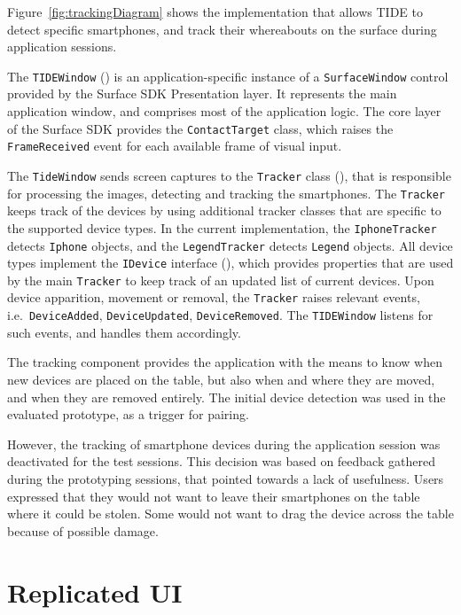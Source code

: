 Figure~\ref{fig:trackingDiagram} shows the implementation that allows TIDE to detect specific smartphones, and track their whereabouts on the surface during application sessions.

The \texttt{TIDEWindow} () is an application-specific instance of a \texttt{SurfaceWindow} control provided by the Surface SDK Presentation layer. 
It represents the main application window, and comprises most of the application logic.
The core layer of the Surface SDK provides the \texttt{ContactTarget} class, which raises the \texttt{FrameReceived} event for each available frame of visual input.

The \texttt{TideWindow} sends screen captures to the \texttt{Tracker} class (), that is responsible for processing the images, detecting and tracking the smartphones.
The \texttt{Tracker} keeps track of the devices by using additional tracker classes that are specific to the supported device types.
In the current implementation, the \texttt{IphoneTracker} detects \texttt{Iphone} objects, and the \texttt{LegendTracker} detects \texttt{Legend} objects.
All device types implement the \texttt{IDevice} interface (), which provides properties that are used by the main \texttt{Tracker} to keep track of an updated list of current devices.
Upon device apparition, movement or removal, the \texttt{Tracker} raises relevant events, i.e.\ \texttt{DeviceAdded}, \texttt{DeviceUpdated}, \texttt{DeviceRemoved}.
The \texttt{TIDEWindow} listens for such events, and handles them accordingly.

The tracking component provides the application with the means to know when new devices are placed on the table, but also when and where they are moved, and when they are removed entirely.
The initial device detection was used in the evaluated prototype, as a trigger for pairing.

However, the tracking of smartphone devices during the application session was deactivated for the test sessions.
This decision was based on feedback gathered during the prototyping sessions, that pointed towards a lack of usefulness.
Users expressed that they would not want to leave their smartphones on the table where it could be stolen.
Some would not want to drag the device across the table because of possible damage.

\section{Replicated UI}
\label{sec:replicatedui}

